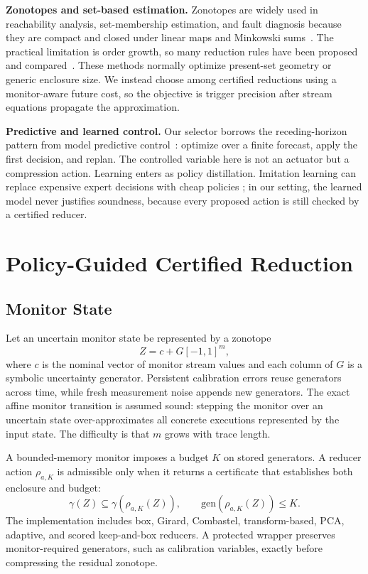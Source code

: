 \documentclass{article}
\newcommand{\gen}{\mathrm{gen}}
\newcommand{\reduce}{\rho}
\newcommand{\concretize}{\gamma}
\begin{document}
\textbf{Zonotopes and set-based estimation.}
Zonotopes are widely used in reachability analysis, set-membership estimation,
and fault diagnosis because they are compact and closed under linear maps and
Minkowski sums~\citep{girard2005reachability,combastel2003state}. The practical
limitation is order growth, so many reduction rules have been proposed and
compared~\citep{kopetzki2017methods,yang2018comparison}. These methods normally
optimize present-set geometry or generic enclosure size. We instead choose
among certified reductions using a monitor-aware future cost, so the objective
is trigger precision after stream equations propagate the approximation.

\textbf{Predictive and learned control.}
Our selector borrows the receding-horizon pattern from model predictive
control~\citep{rawlings2009mpc}: optimize over a finite forecast, apply the
first decision, and replan. The controlled variable here is not an actuator but
a compression action. Learning enters as policy distillation. Imitation learning
can replace expensive expert decisions with cheap policies
\citep{ross2011dagger}; in our setting, the learned model never justifies
soundness, because every proposed action is still checked by a certified
reducer.

\section{Policy-Guided Certified Reduction}

\subsection{Monitor State}

Let an uncertain monitor state be represented by a zonotope
\[
  Z = c + G[-1,1]^m,
\]
where \(c\) is the nominal vector of monitor stream values and each column of
\(G\) is a symbolic uncertainty generator. Persistent calibration errors reuse
generators across time, while fresh measurement noise appends new generators.
The exact affine monitor transition is assumed sound: stepping the monitor over
an uncertain state over-approximates all concrete executions represented by the
input state. The difficulty is that \(m\) grows with trace length.

A bounded-memory monitor imposes a budget \(K\) on stored generators. A reducer
action \(\reduce_{a,K}\) is admissible only when it returns a certificate that
establishes both enclosure and budget:
\begin{equation}
  \concretize(Z) \subseteq \concretize(\reduce_{a,K}(Z)),
  \qquad
  \gen(\reduce_{a,K}(Z)) \le K .
  \label{eq:contract}
\end{equation}
The implementation includes box, Girard, Combastel, transform-based, PCA,
adaptive, and scored keep-and-box reducers. A protected wrapper preserves
monitor-required generators, such as calibration variables, exactly before
compressing the residual zonotope.
\end{document}
